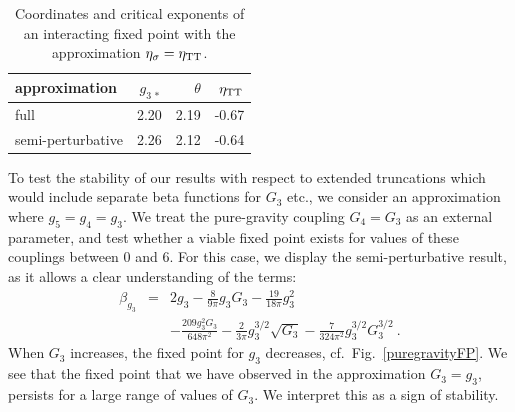 \documentclass[11pt]{book} %
\newcommand{\bea}{\begin{eqnarray}}
\newcommand{\eea}{\end{eqnarray}}
\begin{document}
\begin{table}[]
  \begin{center}
  \begin{tabular}{ l r r r }
    \toprule
    approximation     & $g_{3\,\ast}$ & $\theta$ & $\eta_{\rm TT}$ \\
    \midrule
    full              & 2.20          & 2.19     & -0.67 \\
    semi-perturbative & 2.26          & 2.12     & -0.64 \\
    \bottomrule
  \end{tabular}
  \end{center}
  \caption{
    Coordinates and critical exponents of an interacting fixed point with the
    approximation $\eta_{\sigma} = \eta_{\rm TT}$.
  }
  \label{puregravityFPetaapprox}
\end{table}

To test the stability of our results with respect to extended truncations which would include separate
beta functions for $G_3$ etc.,
we consider an approximation where $g_5=g_4=g_3$.
We treat the pure-gravity coupling $G_4=G_3$ as an external parameter,
and test whether a viable fixed point exists for values of these couplings between 0 and 6.
For this case, we display the semi-perturbative result, as it allows a clear understanding of the terms:
\bea
\beta_{g_3} &=&2 g_3 - \frac{8}{9 \pi} g_3 G_3
- \frac{19}{18 \pi}g_3^2
\\
&{}& - \frac{209 g_3^2 G_3}{648 \pi^2}
- \frac{2}{3 \pi}g_3^{3/2}\sqrt{G_3}
- \frac{7}{324 \pi^2}g_3^{3/2}G_3^{3/2}\ .
\nonumber
\eea
When $G_3$ increases, the fixed point for $g_3$ decreases, cf.~Fig.~\ref{puregravityFP}.
We see that the fixed point that we have observed in the approximation $G_3=g_3$,
persists for a large range of values of $G_3$.
We interpret this as a sign of stability.
\end{document}
